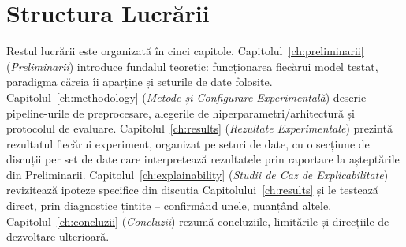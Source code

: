 \section{Structura Lucrării}

Restul lucrării este organizată în cinci capitole. Capitolul~\ref{ch:preliminarii} (\emph{Preliminarii}) introduce fundalul teoretic: funcționarea fiecărui model testat, paradigma căreia îi aparține și seturile de date folosite. Capitolul~\ref{ch:methodology} (\emph{Metode și Configurare Experimentală}) descrie pipeline-urile de preprocesare, alegerile de hiperparametri/arhitectură și protocolul de evaluare. Capitolul~\ref{ch:results} (\emph{Rezultate Experimentale}) prezintă rezultatul fiecărui experiment, organizat pe seturi de date, cu o secțiune de discuții per set de date care interpretează rezultatele prin raportare la așteptările din Preliminarii. Capitolul~\ref{ch:explainability} (\emph{Studii de Caz de Explicabilitate}) revizitează ipoteze specifice din discuția Capitolului~\ref{ch:results} și le testează direct, prin diagnostice țintite -- confirmând unele, nuanțând altele. Capitolul~\ref{ch:concluzii} (\emph{Concluzii}) rezumă concluziile, limitările și direcțiile de dezvoltare ulterioară.